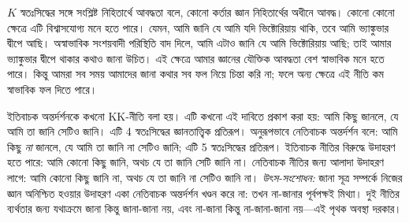 \documentclass[../../../include/open-logic-section]{subfiles}
\begin{document}
$K$ স্বতঃসিদ্ধের সঙ্গে সংশ্লিষ্ট নিহিতার্থে আবদ্ধতা বলে, কোনো কর্তার জ্ঞান নিহিতার্থের অধীনে আবদ্ধ। কোনো কোনো ক্ষেত্রে এটি বিশ্বাসযোগ্য মনে হতে পারে। যেমন, আমি জানি যে আমি যদি ভিক্টোরিয়ায় থাকি, তবে আমি ভ্যাঙ্কুভার দ্বীপে আছি। অস্বাভাবিক সংশয়বাদী পরিস্থিতি বাদ দিলে, আমি এটাও জানি যে আমি ভিক্টোরিয়ায় আছি; তাই আমার ভ্যাঙ্কুভার দ্বীপে থাকার কথাও জানা উচিত। এই ক্ষেত্রে আমার জ্ঞানের যৌক্তিক আবদ্ধতা বেশ স্বাভাবিক মনে হতে পারে। কিন্তু আমরা সব সময় আমাদের জানা কথার সব ফল নিয়ে চিন্তা করি না; ফলে অন্য ক্ষেত্রে এই নীতি কম স্বাভাবিক ফল দিতে পারে।

ইতিবাচক অন্তর্দর্শনকে কখনো KK-নীতি বলা হয়। এটি কখনো এই দাবিতে প্রকাশ করা হয়: আমি কিছু জানলে, যে আমি তা জানি সেটিও জানি। এটি 4 স্বতঃসিদ্ধের জ্ঞানতাত্ত্বিক প্রতিরূপ। অনুরূপভাবে নেতিবাচক অন্তর্দর্শন বলে: আমি কিছু \emph{না} জানলে, যে আমি তা জানি না সেটিও জানি; এটি 5 স্বতঃসিদ্ধের প্রতিরূপ। ইতিবাচক নীতির বিরুদ্ধে উদাহরণ হতে পারে: আমি কোনো কিছু জানি, অথচ যে তা জানি সেটি জানি না। নেতিবাচক নীতির জন্য আলাদা উদাহরণ লাগে: আমি কোনো কিছু জানি না, অথচ যে তা জানি না সেটিও জানি না।
\emph{উৎস-সংশোধন:} জানা সূত্র সম্পর্কে নিজের জ্ঞান অনিশ্চিত হওয়ার উদাহরণ একা নেতিবাচক অন্তর্দর্শন খণ্ডন করে না: তখন না-জানার পূর্বপক্ষই মিথ্যা। দুই নীতির ব্যর্থতার জন্য যথাক্রমে জানা কিন্তু জানা-জানা নয়, এবং না-জানা কিন্তু না-জানা-জানা নয়—এই পৃথক অবস্থা দরকার।
\end{document}
